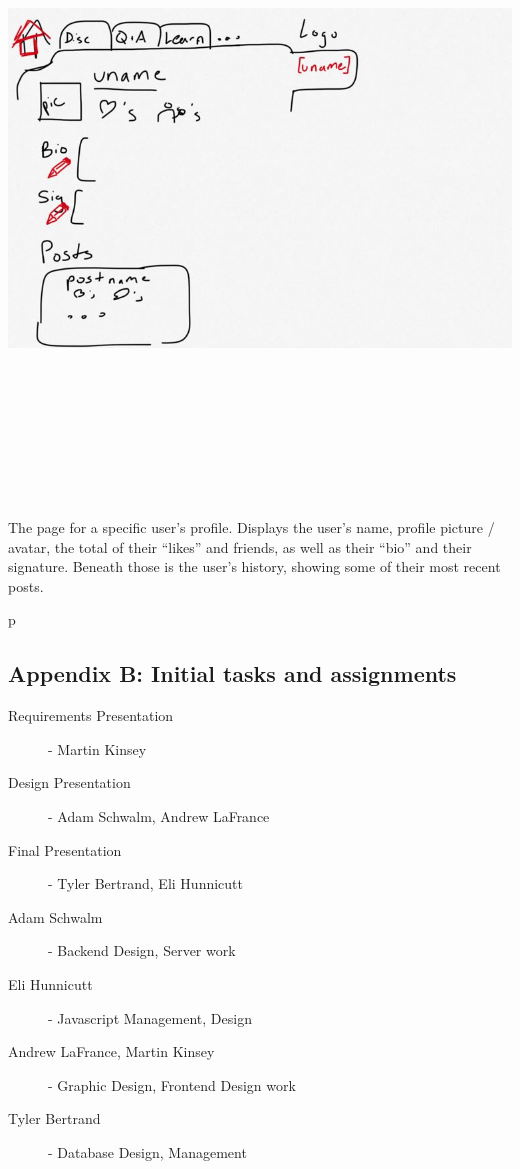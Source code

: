 \documentclass[12pt]{scrartcl}
\begin{document}
\includegraphics[width=17cm, height=17cm, keepaspectratio]{profilepage.png}

The page for a specific user’s profile. Displays the user’s name, profile picture / avatar, the total of their “likes” and friends, as well as their “bio” and their signature. Beneath those is the user’s history, showing some of their most recent posts.

p\subsection{Appendix B: Initial tasks and assignments}
\begin{description}
\item [Requirements Presentation] - Martin Kinsey
\item [Design Presentation] - Adam Schwalm, Andrew LaFrance
\item [Final Presentation] - Tyler Bertrand, Eli Hunnicutt
\vspace{4mm}
\item [Adam Schwalm] - Backend Design, Server work
\item [Eli Hunnicutt] - Javascript Management, Design
\item [Andrew LaFrance, Martin Kinsey] - Graphic Design, Frontend Design work
\item [Tyler Bertrand] - Database Design, Management
\end{description}
\end{document}
